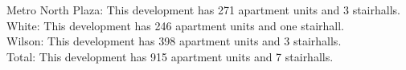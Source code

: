 {Metro North Plaza}: This development has 271 apartment units and 3 stairhalls.\\{White}: This development has 246 apartment units and one stairhall.\\{Wilson}: This development has 398 apartment units and 3 stairhalls.\\{Total}: This development has 915 apartment units and 7 stairhalls.\\